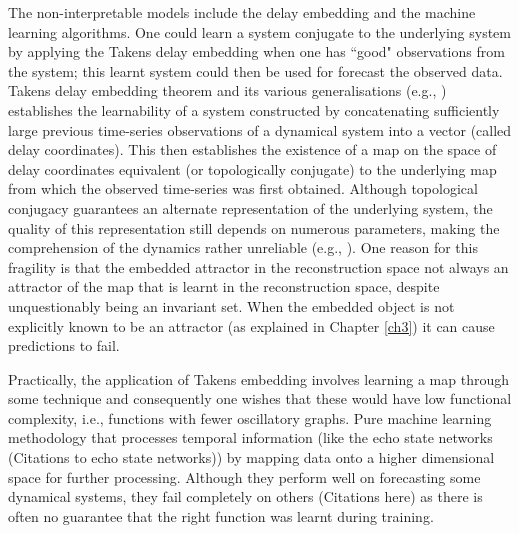 \documentclass[a4paper,12pt,twoside]{report}
\begin{document}
The non-interpretable models include the delay embedding and the machine learning algorithms. One could learn a system conjugate to the underlying system by applying the Takens delay embedding \cite{takens1981detecting} when one has ``good" observations from the system; this learnt system could then be used for forecast the observed data.  Takens delay embedding theorem \cite{takens1981detecting} and its various generalisations (e.g., \cite{sauer1991embedology, stark1999delay, gutman2018embedding}) establishes the learnability of a system constructed by concatenating sufficiently large previous time-series observations of a dynamical system into a vector (called delay coordinates). This then establishes the existence of a map on the space of delay coordinates equivalent (or topologically conjugate) to the underlying map from which the observed time-series was first obtained. Although topological conjugacy guarantees an alternate representation of the underlying system, the quality of this representation still depends on numerous parameters, making the comprehension of the dynamics rather unreliable (e.g., \cite{principe1992prediction}). One reason for this fragility is that the embedded attractor in the reconstruction space not always an attractor of the map that is learnt in the reconstruction space, despite  unquestionably being an invariant set. When the embedded object is not explicitly known to be an attractor (as explained in Chapter \ref{ch3}) it can cause predictions to fail.


Practically, the application of Takens embedding involves learning a map through some technique and consequently one wishes that these would have low functional complexity\cite{manjunath2021universal}, i.e., functions with fewer oscillatory graphs. Pure machine learning methodology that processes temporal information (like the echo state networks (Citations to echo state networks)) by mapping data onto a higher dimensional space for further processing. Although they perform  well on forecasting some dynamical systems, they fail completely on others (Citations here) as there is often no guarantee that the right function was learnt during training.
\end{document}
